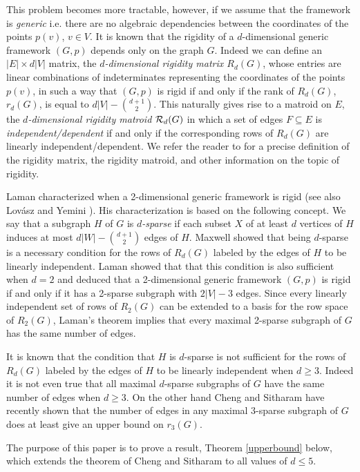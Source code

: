 \documentclass[11pt]{article}
\begin{document}
This problem becomes more tractable, however, if we assume that the
framework is {\em generic} i.e. there  are no algebraic dependencies
between the coordinates of the points $p(v)$, $v\in V$. It is known
that the rigidity of a $d$-dimensional generic framework $(G,p)$
depends only on the graph $G$. Indeed we can define an $|E|\times
d|V|$ matrix, the {\em $d$-dimensional rigidity matrix $R_d(G)$},
whose entries are linear combinations of indeterminates representing
the coordinates of the points $p(v)$,  in such a way that $(G,p)$ is
rigid if and only if the rank of $R_d(G)$, $r_d(G)$, is equal to
$d|V|-{{d+1}\choose{2}}$. This naturally gives rise to a matroid on
$E$, the {\em $d$-dimensional rigidity matroid ${\cal R}_d(G)$} in
which a set of edges $F\subseteq E$ is {\em independent/dependent}
if and only if the corresponding rows of $R_d(G)$ are linearly
independent/dependent. We refer the reader to \cite{W} for a precise
definition of the rigidity matrix, the rigidity matroid, and other
information on the topic of rigidity.


Laman \cite{L} characterized when a 2-dimensional generic framework
is rigid (see also Lov\'asz and Yemini \cite{LY}). His
characterization is based on the following concept. We say that a
subgraph $H$ of $G$ is {\em $d$-sparse} if each subset $X$ of at
least $d$ vertices of $H$induces at most $d|W|-{{d+1}\choose{2}}$
edges of $H$. Maxwell \cite{M} showed that being $d$-sparse is a
necessary condition for the rows of $R_d(G)$ labeled by the edges of
$H$ to be linearly independent. Laman showed that that this
condition is also sufficient when $d=2$ and deduced that a
2-dimensional generic framework $(G,p)$ is rigid if and only if it
has a 2-sparse subgraph with $2|V|-3$ edges. Since every linearly
independent set of rows of $R_2(G)$ can be extended to a basis for
the row space of $R_2(G)$, Laman's theorem implies that every
maximal 2-sparse subgraph of $G$ has the same number of edges.

It is known that the condition that $H$ is $d$-sparse is not
sufficient for the rows of $R_d(G)$ labeled by the edges of $H$ to
be linearly independent when $d\geq 3$. Indeed it is not even true
that all maximal $d$-sparse subgraphs of $G$ have the same number of
edges when $d\geq 3$. On the other hand Cheng and Sitharam \cite{CS}
have recently shown that the number of edges in any maximal
$3$-sparse subgraph of $G$ does at least give an upper bound on
$r_3(G)$.

The purpose of this paper is to prove a result, Theorem
\ref{upperbound} below, which extends the theorem of Cheng and
Sitharam to all values of $d\leq 5$.
\end{document}
